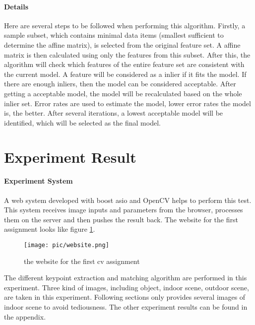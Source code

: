 \documentclass[paper=a4, fontsize=11pt]{scrartcl} %
\numberwithin{equation}{section} %
\numberwithin{figure}{section} %
\numberwithin{table}{section} %
\begin{document}
\paragraph{Details}
Here are several steps to be followed when performing this algorithm. 
Firstly, a sample subset, which contains minimal data items (smallest sufficient to determine the affine matrix), is selected from the original feature set.
A affine matrix is then calculated using only the features from this subset.
After this, the algorithm will check which features of the entire feature set are consistent with the current model.
A feature will be considered as a inlier if it fits the model.
If there are enough inliers, then the model can be considered acceptable.
After getting a acceptable model, the model will be recalculated based on the whole inlier set.
Error rates are used to estimate the model, lower error rates the model is, the better.
After several iterations, a lowest acceptable model will be identified, which will be selected as the final model.

\section{Experiment Result}

\paragraph{Experiment System}
A web system developed with boost asio and OpenCV helps to perform this test. 
This system receives image inputs and parameters from the browser, processes them on the server and then pushes the result back.
The website for the first assignment looks like figure \ref{fig:website}.

\begin{figure}[H]
\centering
\texttt{[image: pic/website.png]}
\caption{the website for the first cv assignment}
\label{fig:website}
\end{figure}

The different keypoint extraction and matching algorithm are performed in this experiment.
Three kind of images, including object, indoor scene, outdoor scene, are taken in this experiment.
Following sections only provides several images of indoor scene to avoid tediousness.
The other experiment results can be found in the appendix.
\end{document}
